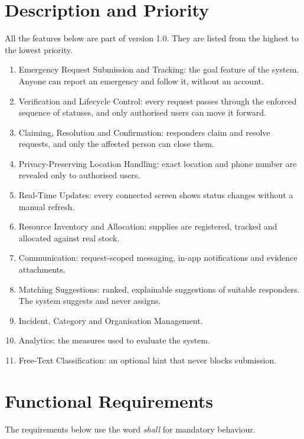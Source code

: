 \documentclass{scrreprt}
\newcounter{fr}
\begin{document}
\section{Description and Priority}
All the features below are part of version 1.0. They are listed from the highest to the lowest priority.
\begin{enumerate}
    \item Emergency Request Submission and Tracking: the goal feature of the system. Anyone can report an emergency and follow it, without an account.
    \item Verification and Lifecycle Control: every request passes through the enforced sequence of statuses, and only authorised users can move it forward.
    \item Claiming, Resolution and Confirmation: responders claim and resolve requests, and only the affected person can close them.
    \item Privacy-Preserving Location Handling: exact location and phone number are revealed only to authorised users.
    \item Real-Time Updates: every connected screen shows status changes without a manual refresh.
    \item Resource Inventory and Allocation: supplies are registered, tracked and allocated against real stock.
    \item Communication: request-scoped messaging, in-app notifications and evidence attachments.
    \item Matching Suggestions: ranked, explainable suggestions of suitable responders. The system suggests and never assigns.
    \item Incident, Category and Organisation Management.
    \item Analytics: the measures used to evaluate the system.
    \item Free-Text Classification: an optional hint that never blocks submission.
\end{enumerate}

\section{Functional Requirements}
The requirements below use the word \emph{shall} for mandatory behaviour.
\end{document}
